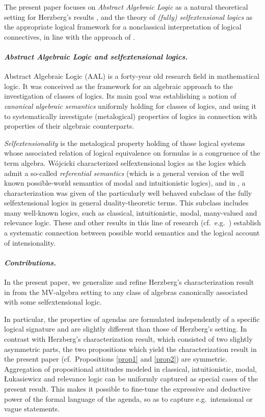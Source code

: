 \documentclass{llncs}
\numberwithin{equation}{section}
\begin{document}
The present paper focuses on {\em Abstract Algebraic Logic}  as a natural theoretical setting for Herzberg's results \cite{He08,He13}, and the theory of {\em (fully) selfextensional logics} as the  appropriate logical framework for a nonclassical interpretation of logical connectives, in line with the approach of \cite{Di10}.

\paragraph{\bf\em Abstract Algebraic Logic and selfextensional logics.} Abstract Algebraic Logic (AAL) \cite{FoJaPi03} is a forty-year old research field in mathematical logic. It was conceived as the framework for an algebraic approach to the investigation of classes of logics. Its main goal was establishing a notion of {\em canonical algebraic semantics} uniformly holding for classes of logics, and using it to systematically investigate (metalogical) properties of logics in connection with properties of their algebraic counterparts.

{\em Selfextensionality} is the metalogical property holding of those logical systems whose associated relation of logical equivalence on formulas is a congruence of  the term algebra.  W\'ojcicki \cite{Wo79} characterized  selfextensional logics as the logics which admit a so-called {\em referential semantics} (which is a general version of the well known possible-world semantics of modal and intuitionistic logics), and in \cite{JaPa06}, a characterization was given of the particularly well behaved subclass of the fully selfextensional logics in general duality-theoretic terms. This subclass includes many well-known logics, such as classical, intuitionistic, modal, many-valued and relevance logic. These and other results in this line of research (cf.\ e.g.\ \cite{Ja05,GJP10,Es13,EsJa14}) establish a systematic connection between possible world semantics and the logical account of intensionality.

\paragraph{\bf\em Contributions.}
In the present paper, we generalize and refine Herzberg's characterization result in \cite{He13} from the MV-algebra setting to any class of algebras canonically associated with some  selfextensional logic.

In  particular, the properties of agendas are formulated independently of a specific logical signature and are slightly different than those of Herzberg's setting.  In contrast with Herzberg's characterization result, which consisted of two slightly asymmetric parts, the two propositions which yield the characterization result in the present paper (cf.\ Propositions \ref{prop1} and \ref{prop2}) are symmetric. Aggregation of propositional attitudes modeled in classical, intuitionistic, modal, \L ukasiewicz and relevance logic can be uniformly captured as special cases of the present result.
 This makes it possible to fine-tune the expressive and deductive power of the formal language of the agenda, so as to capture e.g.\ intensional or vague statements.
\end{document}
